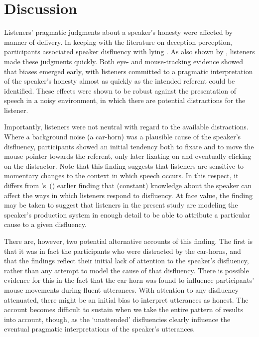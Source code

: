 \documentclass[a4paper,man,natbib]{apa6}
\newcommand*{\citegen}[1]{\citeauthor{#1}'s~(\citeyear{#1})}
\begin{document}
\section{Discussion}
Listeners' pragmatic judgments about a speaker's honesty were affected by manner of delivery.
In keeping with the literature on deception perception, participants associated speaker disfluency with lying \citep{Zuckerman1981,depaulo2003cues}. 
As also shown by \citet{Loy2016}, listeners made these judgments quickly.
Both eye- and mouse-tracking evidence showed that biases emerged early, with listeners committed to a pragmatic interpretation of the speaker's honesty almost as quickly as the intended referent could be identified.
These effects were shown to be robust against the presentation of speech in a noisy environment, in which there are potential distractions for the listener.

Importantly, listeners were not neutral with regard to the available distractions.
Where a background noise (a car-horn) was a plausible cause of the speaker's disfluency, participants showed an initial tendency both to fixate and to move the mouse pointer towards the referent, only later fixating on and eventually clicking on the distractor.
Note that this finding suggests that listeners are sensitive to momentary changes to the context in which speech occurs.
In this respect, it differs from \citegen{Arnold2007} earlier finding that (constant) knowledge about the speaker can affect the ways in which listeners respond to disfluency.
At face value, the finding may be taken to suggest that listeners in the present study are modeling the speaker's production system in enough detail to be able to attribute a particular cause to a given disfluency.

There are, however, two potential alternative accounts of this finding.
The first is that it was in fact the participants who were distracted by the car-horns, and that the findings reflect their initial lack of attention to the speaker's disfluency, rather than any attempt to model the cause of that disfluency.
There is possible evidence for this in the fact that the car-horn was found to influence participants' mouse movements during fluent utterances. 
With attention to any disfluency attenuated, there might be an initial bias to interpret utterances as honest. 
The account becomes difficult to sustain when we take the entire pattern of results into account, though, as the `unattended' disfluencies clearly influence the eventual pragmatic interpretations of the speaker's utterances.
\end{document}
